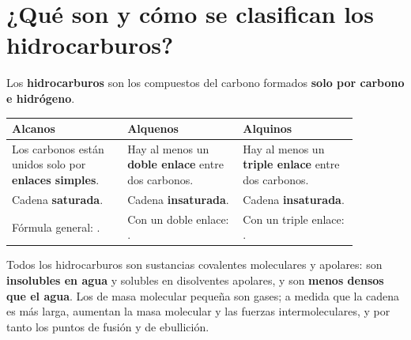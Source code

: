 \section{¿Qué son y cómo se clasifican los hidrocarburos?}

Los \textbf{hidrocarburos} son los compuestos del carbono formados \textbf{solo por carbono e hidrógeno}.

\begin{center}
    {\small
    \begin{tabular}{@{}L{0.29\linewidth} L{0.29\linewidth} L{0.29\linewidth}@{}}
        \toprule
        \textbf{Alcanos} & \textbf{Alquenos} & \textbf{Alquinos} \\
        \midrule
        Los carbonos están unidos solo por \textbf{enlaces simples}. & Hay al menos un \textbf{doble enlace} entre dos carbonos. & Hay al menos un \textbf{triple enlace} entre dos carbonos. \\[3pt]
        Cadena \textbf{saturada}. & Cadena \textbf{insaturada}. & Cadena \textbf{insaturada}. \\[3pt]
        Fórmula general: . & Con un doble enlace: . & Con un triple enlace: . \\
        \bottomrule
    \end{tabular}
    }
\end{center}

Todos los hidrocarburos son sustancias covalentes moleculares y apolares: son \textbf{insolubles en agua} y solubles en disolventes apolares, y son \textbf{menos densos que el agua}. Los de masa molecular pequeña son gases; a medida que la cadena es más larga, aumentan la masa molecular y las fuerzas intermoleculares, y por tanto los puntos de fusión y de ebullición.

